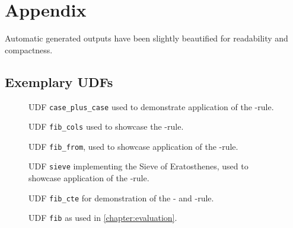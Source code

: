\cleardoublepage
\renewcommand{\thesection}{\Alph{section}}%

\chapter[Appendix]{Appendix}
Automatic generated outputs have been slightly beautified for readability and compactness.

\section{Exemplary UDFs}

\begin{figure}[h!]
    \centering
    
    \caption{UDF \texttt{case\_plus\_case} used to demonstrate application of the \REXPR-rule.}
    \label{udf:case_plus_case}
\end{figure}

\begin{figure}[h!]
    \centering
    
    \caption{UDF \texttt{fib\_cols} used to showcase the \RSELECT-rule.}
    \label{udf:fib_cols}
\end{figure}

\begin{figure}[h!]
    \centering
    
    \caption{UDF \texttt{fib\_from}, used to showcase application of the \RFROM-rule.}
    \label{udf:fib_from}
\end{figure}

\begin{figure}[h!]
    \centering
    
    \caption{UDF \texttt{sieve} implementing the Sieve of Eratosthenes, used to showcase application of the \RWHERE-rule.}
    \label{udf:sieve}
\end{figure}

\begin{figure}[h!]
    \centering
    
    \caption{UDF \texttt{fib\_cte} for demonstration of the \RCTE- and \RWITH-rule.}
    \label{udf:fib_cte}
\end{figure}

\begin{figure}[h!]
    \centering
    
    \caption{UDF \texttt{fib} as used in \autoref{chapter:evaluation}.}
    \label{udf:fib}
\end{figure}

